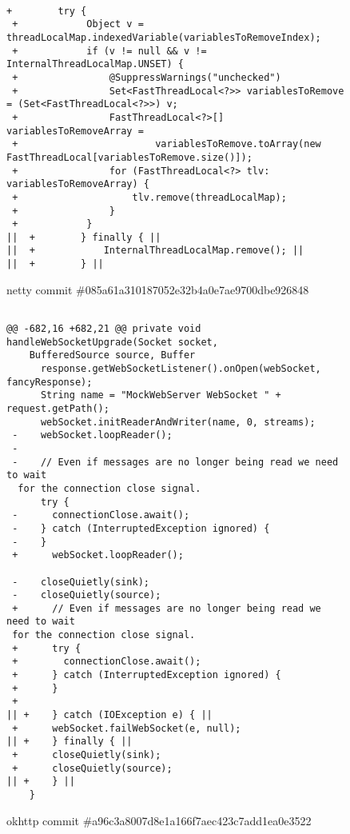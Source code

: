 \begin{figure*}
\begin{lstlisting}[moredelim={[is][keywordstyle]{||}{||}}]

+        try {
 +            Object v = threadLocalMap.indexedVariable(variablesToRemoveIndex);
 +            if (v != null && v != InternalThreadLocalMap.UNSET) {
 +                @SuppressWarnings("unchecked")
 +                Set<FastThreadLocal<?>> variablesToRemove = (Set<FastThreadLocal<?>>) v;
 +                FastThreadLocal<?>[] variablesToRemoveArray =
 +                        variablesToRemove.toArray(new FastThreadLocal[variablesToRemove.size()]);
 +                for (FastThreadLocal<?> tlv: variablesToRemoveArray) {
 +                    tlv.remove(threadLocalMap);
 +                }
 +            }
||  +        } finally { || 
||  +            InternalThreadLocalMap.remove(); ||
||  +        } ||
 \end{lstlisting}
\caption{netty commit \#085a61a310187052e32b4a0e7ae9700dbe926848\label{fig:thread1}}
\end{figure*}


\begin{figure*}
\begin{lstlisting}[moredelim={[is][keywordstyle]{||}{||}}]

@@ -682,16 +682,21 @@ private void handleWebSocketUpgrade(Socket socket, 
    BufferedSource source, Buffer
      response.getWebSocketListener().onOpen(webSocket, fancyResponse);
      String name = "MockWebServer WebSocket " + request.getPath();
      webSocket.initReaderAndWriter(name, 0, streams);
 -    webSocket.loopReader();
 -
 -    // Even if messages are no longer being read we need to wait
  for the connection close signal.
      try {
 -      connectionClose.await();
 -    } catch (InterruptedException ignored) {
 -    }
 +      webSocket.loopReader();
  
 -    closeQuietly(sink);
 -    closeQuietly(source);
 +      // Even if messages are no longer being read we need to wait 
 for the connection close signal.
 +      try {
 +        connectionClose.await();
 +      } catch (InterruptedException ignored) {
 +      }
 +
|| +    } catch (IOException e) { ||
 +      webSocket.failWebSocket(e, null); 
|| +    } finally { || 
 +      closeQuietly(sink);
 +      closeQuietly(source);
|| +    } ||
    }
\end{lstlisting}
\caption{okhttp commit \#a96c3a8007d8e1a166f7aec423c7add1ea0e3522\label{fig:thread2}}
\end{figure*}


